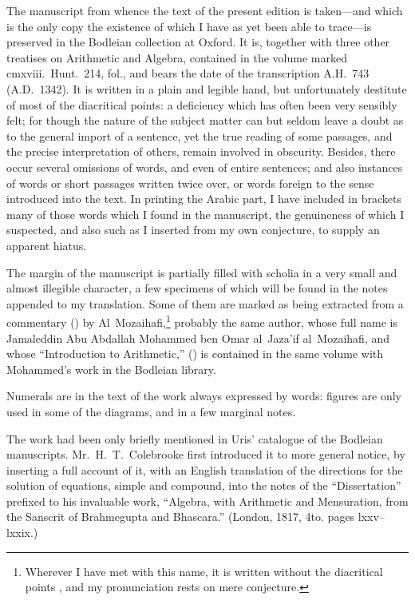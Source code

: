 The manuscript from whence the text of the present edition is taken---and which is the only copy the existence of which I have as yet been able to trace---is preserved in the Bodleian collection at Oxford. It is, together with three other treatises on Arithmetic and Algebra, contained in the volume marked cmxviii.~Hunt.~214, fol., and bears the date of the transcription A.H.~743 (A.D.~1342). It is written in a plain and legible hand, but unfortunately destitute of most of the diacritical points: a deficiency which has often been very sensibly felt; for though the nature of the subject matter can but seldom leave a doubt as to the general import of a sentence, yet the true reading of some passages, and the precise interpretation of others, remain involved in obscurity. Besides, there occur several omissions of words, and even of entire sentences; and also instances of words or short passages written twice over, or words foreign to the sense introduced into the text. In printing the Arabic part, I have included in brackets many of those words which I found in the manuscript, the genuineness of which I suspected, and also such as I inserted from my own conjecture, to supply an apparent hiatus.

The margin of the manuscript is partially filled with scholia in a very small and almost illegible character, a few specimens of which will be found in the notes appended to my translation. Some of them are marked as being extracted from a commentary () by Al~Mozaihafi,\footnote{Wherever I have met with this name, it is written without the diacritical points , and my pronunciation rests on mere conjecture.} probably the same author, whose full name is Jamaleddin Abu Abdallah Mohammed ben Omar al~Jaza'if al~Mozaihafi, and whose ``Introduction to Arithmetic,'' () is contained in the same volume with Mohammed's work in the Bodleian library.

Numerals are in the text of the work always expressed by words: figures are only used in some of the diagrams, and in a few marginal notes.

The work had been only briefly mentioned in Uris' catalogue of the Bodleian manuscripts. Mr.~H.~T.~Colebrooke first introduced it to more general notice, by inserting a full account of it, with an English translation of the directions for the solution of equations, simple and compound, into the notes of the ``Dissertation'' prefixed to his invaluable work, ``Algebra, with Arithmetic and Mensuration, from the Sanscrit of Brahmegupta and Bhascara.'' (London, 1817, 4to. pages lxxv--lxxix.)

